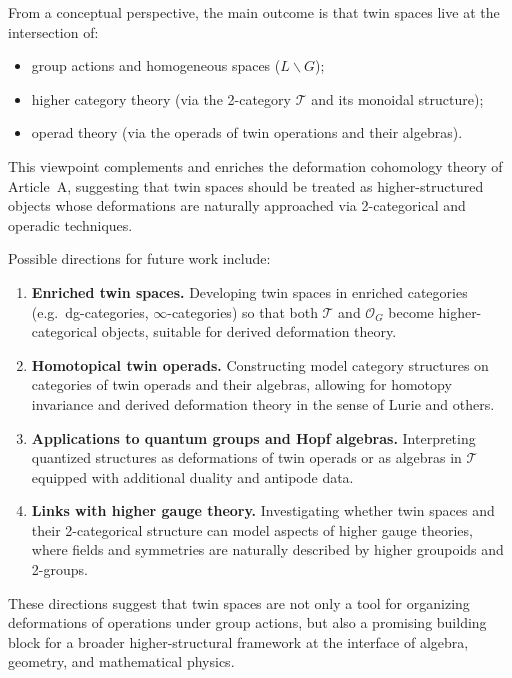 \documentclass[11pt,a4paper]{article}
\numberwithin{equation}{section}
\newcommand{\Twin}{\mathcal{T}}
\newcommand{\LinearSubgroup}{L}
\begin{document}
	From a conceptual perspective, the main outcome is that twin spaces live at the intersection of:
	\begin{itemize}
		\item group actions and homogeneous spaces ($\LinearSubgroup\backslash G$);
		\item higher category theory (via the 2-category $\Twin$ and its monoidal structure);
		\item operad theory (via the operads of twin operations and their algebras).
	\end{itemize}
	This viewpoint complements and enriches the deformation cohomology theory of Article~A, suggesting that
	twin spaces should be treated as higher-structured objects whose deformations are naturally approached
	via 2-categorical and operadic techniques.
	
	Possible directions for future work include:
	\begin{enumerate}[label=(\alph*)]
		\item \textbf{Enriched twin spaces.}
		Developing twin spaces in enriched categories (e.g.\ dg-categories, $\infty$-categories) so that both
		$\Twin$ and $\mathcal{O}_G$ become higher-categorical objects, suitable for derived deformation theory.
		\item \textbf{Homotopical twin operads.}
		Constructing model category structures on categories of twin operads and their algebras, allowing for 
		homotopy invariance and derived deformation theory in the sense of Lurie and others.
		\item \textbf{Applications to quantum groups and Hopf algebras.}
		Interpreting quantized structures as deformations of twin operads or as algebras in $\Twin$ equipped with
		additional duality and antipode data.
		\item \textbf{Links with higher gauge theory.}
		Investigating whether twin spaces and their 2-categorical structure can model aspects of higher gauge theories,
		where fields and symmetries are naturally described by higher groupoids and 2-groups.
	\end{enumerate}
	
	These directions suggest that twin spaces are not only a tool for organizing deformations of operations under 
	group actions, but also a promising building block for a broader higher-structural framework at the interface 
	of algebra, geometry, and mathematical physics.
	
\end{document}
